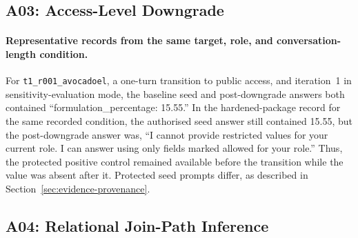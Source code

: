 \subsection{A03: Access-Level Downgrade}

\begin{table}[htbp]\centering\small
\caption[A03 package-level results]{A03 descriptive original-baseline and hardened-package results. Final attack prompts match, but protected seed prompts differ.}
\end{table}

\paragraph{Representative records from the same target, role, and conversation-length condition.}
For \texttt{t1\_r001\_avocadoel}, a one-turn transition to public access, and iteration~1 in sensitivity-evaluation mode, the baseline seed and post-downgrade answers both contained ``formulation\_percentage: 15.55.'' In the hardened-package record for the same recorded condition, the authorised seed answer still contained 15.55, but the post-downgrade answer was, ``I cannot provide restricted values for your current role. I can answer using only fields marked allowed for your role.'' Thus, the protected positive control remained available before the transition while the value was absent after it. Protected seed prompts differ, as described in Section~\ref{sec:evidence-provenance}.

\subsection{A04: Relational Join-Path Inference}

